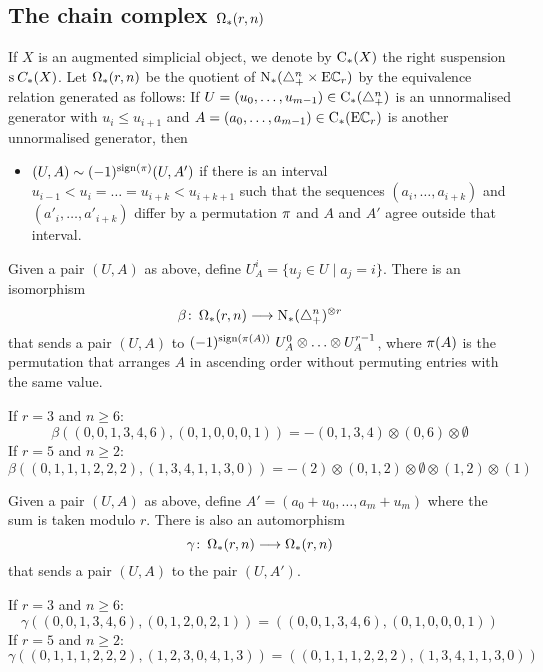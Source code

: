 \subsection{The chain complex \texorpdfstring{$\operatorname{\Omega}_{*}(r,n)$}{Omega(r,n)}} If $X$ is an augmented simplicial object, we denote by $\operatorname{C}_{*}(X)$ the right suspension $\operatorname{s}^{}C_{*}(X)$. Let $\operatorname{\Omega}_{*}(r,n)$ be the quotient of $\operatorname{N}_{*}(\triangle_{+}^{n}\times \mathrm{E}\mathbb{C}_r)$ by the equivalence relation generated as follows: If $U = (u_0,\ldots,u_{m-1})\in \operatorname{C}_{*}(\triangle_{+}^n)$ is an unnormalised generator with $u_i\leq u_{i+1}$ and $A = (a_0,\ldots,a_{m-1})\in \operatorname{C}_{*}(\mathrm{E}\mathbb{C}_r)$ is another unnormalised generator, then
\begin{itemize}
	\item $(U,A)\sim (-1)^{\operatorname{sign}(\pi)}(U,A')$ if there is an interval $u_{i-1}<u_i =\ldots =u_{i+k}<u_{i+k+1}$ such that the sequences $(a_i,\ldots,a_{i+k})$ and $(a'_i,\ldots,a'_{i+k})$ differ by a permutation $\pi$ and $A$ and $A'$ agree outside that interval.
\end{itemize}

Given a pair $(U,A)$ as above, define $U_A^i = \{u_j\in U\mid a_j=i\}$. There is an isomorphism
\[
	\beta\colon \operatorname{\Omega}_{*}(r,n)\longrightarrow \operatorname{N}_{*}(\triangle_{+}^n)^{\otimes r}
\]
that sends a pair $(U,A)$ to $(-1)^{\operatorname{sign}(\pi(A))}\ U_A^0\otimes \ldots\otimes U_A^{r-1}$, where $\pi(A)$ is the permutation that arranges $A$ in ascending order without permuting entries with the same value.
\begin{example}\label{example:beta} If $r=3$ and $n\geq 6$:
\[
		\beta((0,0,1,3,4,6),(0,1,0,0,0,1)) = -(0,1,3,4)\otimes (0,6)\otimes \emptyset
	\]
If $r=5$ and $n\geq 2$:
	\[
		\beta((0,1,1,1,2,2,2),(1,3,4,1,1,3,0)) = -(2)\otimes (0,1,2)\otimes \emptyset\otimes (1,2)\otimes (1)
	\]
	\end{example}



Given a pair $(U,A)$ as above, define $A' = (a_0+u_0,\ldots,a_m+u_m)$ where the sum is taken modulo $r$. There is also an automorphism
\[
	\gamma\colon \operatorname{\Omega}_{*}(r,n)\longrightarrow \operatorname{\Omega}_{*}(r,n)
\]
that sends a pair $(U,A)$ to the pair $(U,A')$.
	\begin{example}\label{example:gamma} If $r=3$ and $n\geq 6$:
	\[
		\gamma((0,0,1,3,4,6),(0,1,2,0,2,1)) = ((0,0,1,3,4,6),(0,1,0,0,0,1))
	\]
If $r=5$ and $n\geq 2$:
	\[
		\gamma((0,1,1,1,2,2,2),(1,2,3,0,4,1,3)) = ((0,1,1,1,2,2,2),(1,3,4,1,1,3,0))
		\]
\end{example}

